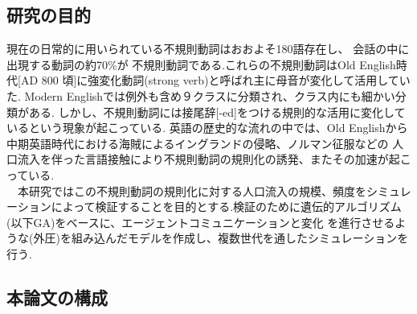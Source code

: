 \subsection{研究の目的}
現在の日常的に用いられている不規則動詞はおおよそ180語存在し、
会話の中に出現する動詞の約70\%が
不規則動詞である\cite{pinker}.これらの不規則動詞はOld English時代[AD 800 頃]に強変化動詞(strong verb)と呼ばれ主に母音が変化して活用していた.
Modern Englishでは例外も含め９クラスに分類され、クラス内にも細かい分類がある\cite{pinker2}.
しかし、不規則動詞には接尾辞[-ed]をつける規則的な活用に変化しているという現象が起こっている.
英語の歴史的な流れの中では、Old Englishから中期英語時代における海賊によるイングランドの侵略、ノルマン征服などの
人口流入を伴った言語接触により不規則動詞の規則化の誘発、またその加速が起こっている.\\
　本研究ではこの不規則動詞の規則化に対する人口流入の規模、頻度をシミュレーションによって検証することを目的とする.検証のために遺伝的アルゴリズム\cite{iba_ga}(以下GA)をベースに、エージェントコミュニケーションと変化
を進行させるような(外圧)を組み込んだモデルを作成し、複数世代を通したシミュレーションを行う.

\subsection{本論文の構成}
